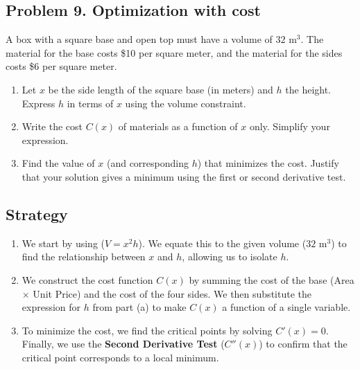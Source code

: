 \subsection{Problem 9. Optimization with cost}
A box with a square base and open top must have a volume of $32\text{ m}^{3}$. The material for the base costs \$10 per square meter, and the material for the sides costs \$6 per square meter.

\begin{enumerate}[label=(\alph*)]
    \item Let $x$ be the side length of the square base (in meters) and $h$ the height. Express $h$ in terms of $x$ using the volume constraint.
    \item Write the cost $C(x)$ of materials as a function of $x$ only. Simplify your expression.
    \item Find the value of $x$ (and corresponding $h$) that minimizes the cost. Justify that your solution gives a minimum using the first or second derivative test.
\end{enumerate}

\subsection*{Strategy}
\begin{enumerate}[label=(\alph*)]
    \item We start by using ($V = x^2h$). We equate this to the given volume ($32\text{ m}^3$) to find the relationship between $x$ and $h$, allowing us to isolate $h$.
    \item We construct the cost function $C(x)$ by summing the cost of the base (Area $\times$ Unit Price) and the cost of the four sides. We then substitute the expression for $h$ from part (a) to make $C(x)$ a function of a single variable.
    \item To minimize the cost, we find the critical points by solving $C'(x) = 0$. Finally, we use the \textbf{Second Derivative Test} ($C''(x)$) to confirm that the critical point corresponds to a local minimum.
\end{enumerate}

